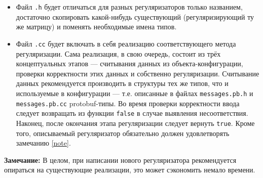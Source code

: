 \begin{itemize}
	\item Файл \verb'.h' будет отличаться для разных регуляризаторов только названием, достаточно скопировать какой-нибудь существующий (регуляризирующий ту же матрицу) и поменять необходимые имена типов.
	
	\item Файл \verb'.cc' будет включать в себя реализацию соответствующего метода регуляризации. Сама реализация, в свою очередь, состоит из трёх концептуальных этапов --- считывания данных из объекта-конфигурации, проверки корректности этих данных и собственно регуляризации. Считывание данных рекомендуется производить в структуры тех же типов, что и используемые в конфигурации --- т.е. описанные в файлах \verb'messages.pb.h' и \verb'messages.pb.cc' protobuf-типы. Во время проверки корректности ввода следует возвращать из функции \verb'false' в случае выявления несоответствия. Наконец, после окончания этапа регуляризации следует вернуть \verb'true'. Кроме того, описываемый регуляризатор обязательно должен удовлетворять замечанию \ref{note}.
	
\end{itemize}

{\bf Замечание: } В целом, при написании нового регуляризатора рекомендуется опираться на существующие реализации, это может сэкономить немало времени.
